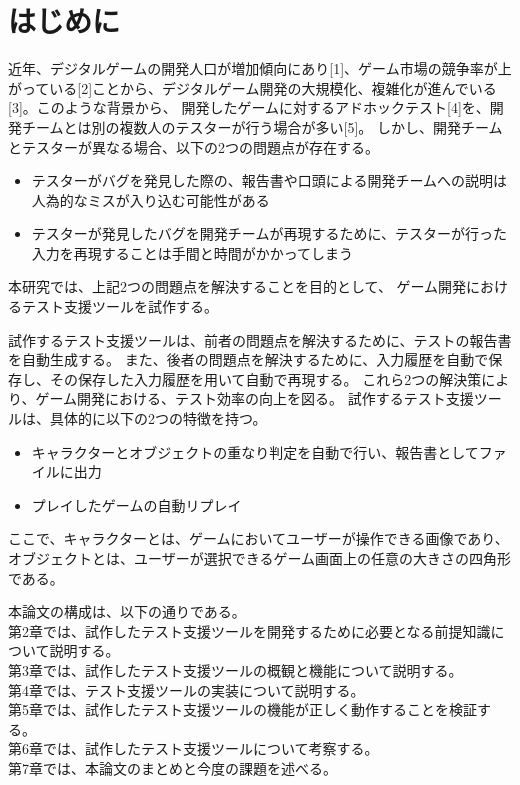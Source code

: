 \chapter{はじめに}\label{cha:Introduction}

近年、デジタルゲームの開発人口が増加傾向にあり[1]、ゲーム市場の競争率が上がっている[2]ことから、デジタルゲーム開発の大規模化、複雑化が進んでいる[3]。このような背景から、
開発したゲームに対するアドホックテスト[4]を、開発チームとは別の複数人のテスターが行う場合が多い[5]。
しかし、開発チームとテスターが異なる場合、以下の2つの問題点が存在する。

\begin{itemize}
	\item テスターがバグを発見した際の、報告書や口頭による開発チームへの説明は人為的なミスが入り込む可能性がある
	\item テスターが発見したバグを開発チームが再現するために、テスターが行った入力を再現することは手間と時間がかかってしまう
\end{itemize}

本研究では、上記2つの問題点を解決することを目的として、
ゲーム開発におけるテスト支援ツールを試作する。

試作するテスト支援ツールは、前者の問題点を解決するために、テストの報告書を自動生成する。
また、後者の問題点を解決するために、入力履歴を自動で保存し、その保存した入力履歴を用いて自動で再現する。
これら2つの解決策により、ゲーム開発における、テスト効率の向上を図る。
試作するテスト支援ツールは、具体的に以下の2つの特徴を持つ。
\begin{itemize}
	\item キャラクターとオブジェクトの重なり判定を自動で行い、報告書としてファイルに出力
	\item プレイしたゲームの自動リプレイ
\end{itemize}

ここで、キャラクターとは、ゲームにおいてユーザーが操作できる画像であり、
オブジェクトとは、ユーザーが選択できるゲーム画面上の任意の大きさの四角形である。

本論文の構成は、以下の通りである。\\
第2章では、試作したテスト支援ツールを開発するために必要となる前提知識について説明する。\\
第3章では、試作したテスト支援ツールの概観と機能について説明する。\\
第4章では、テスト支援ツールの実装について説明する。\\
第5章では、試作したテスト支援ツールの機能が正しく動作することを検証する。\\
第6章では、試作したテスト支援ツールについて考察する。\\
第7章では、本論文のまとめと今度の課題を述べる。\\

